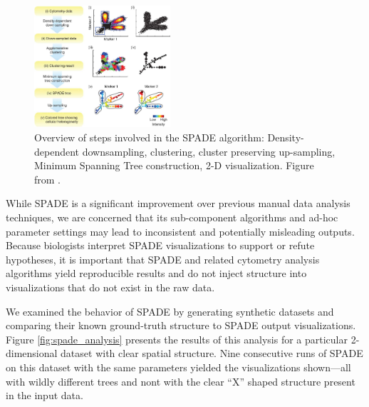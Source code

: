 \documentclass{article}
\begin{document}
\begin{figure}
\begin{center}
\includegraphics[width=0.45\textwidth]{Figures/SPADE-flowchart.jpg}
\end{center}
\caption{Overview of steps involved in the SPADE algorithm: Density-dependent downsampling, clustering, cluster preserving up-sampling, Minimum Spanning Tree construction, 2-D visualization.  Figure from \cite{}. }
\label{fig:spade_overview}
\end{figure}


While SPADE is a significant improvement over previous manual data analysis techniques, 
we are concerned that its  sub-component algorithms and ad-hoc parameter settings may lead to inconsistent and potentially misleading outputs.  
Because biologists interpret SPADE visualizations to support or refute hypotheses, it is important that SPADE and related cytometry analysis algorithms  yield reproducible results and do not  inject structure into visualizations that do not exist in the raw data. 

We examined the behavior of SPADE by generating synthetic datasets and comparing their known ground-truth structure to SPADE output visualizations. 
 Figure \ref{fig:spade_analysis} presents the results of this analysis for a particular 2-dimensional dataset with clear spatial structure. 
 Nine consecutive runs of SPADE on this dataset with the same parameters yielded the visualizations shown---all with wildly different trees and nont with the clear ``X'' shaped structure present in the input data. 
 
\end{document}
